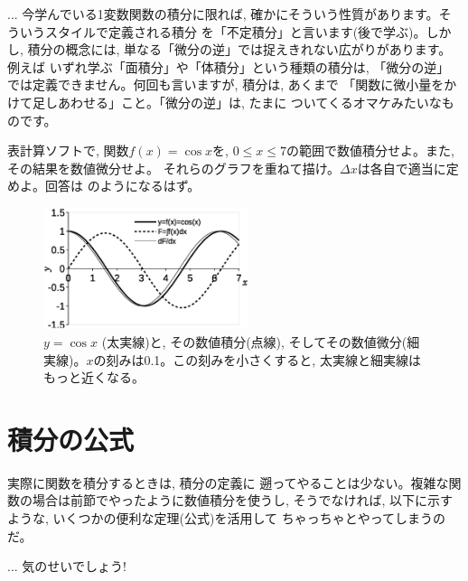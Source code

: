 \begin{freqmiss}{\small{} ... 今学んでいる1変数関数の積分に限れば, 
確かにそういう性質があります。そういうスタイルで定義される積分
を「不定積分」と言います(後で学ぶ)。しかし, 積分の概念には, 
単なる「微分の逆」では捉えきれない広がりがあります。例えば
いずれ学ぶ「面積分」や「体積分」という種類の積分は, 「微分の逆」
では定義できません。何回も言いますが, 積分は, あくまで
「関数に微小量をかけて足しあわせる」こと。「微分の逆」は, たまに
ついてくるオマケみたいなものです。}\end{freqmiss}

\begin{q}\label{q:comp_int2} 表計算ソフトで, 関数$f(x)=\cos x$を, 
$0 \le x \le 7$の範囲で数値積分せよ。また, その結果を数値微分せよ。
それらのグラフを重ねて描け。$\Delta x$は各自で適当に定めよ。回答は
のようになるはず。
\end{q}\mv

\begin{figure}[h]
    \centering
    \includegraphics[width=6cm]{intcos.eps}
    \caption{$y=\cos x$ (太実線)と, その数値積分(点線), 
そしてその数値微分(細実線)。$x$の刻みは0.1。この刻みを小さくすると, 
太実線と細実線はもっと近くなる。}\label{fig:intcos}
\end{figure}


\section{積分の公式}\label{sect:integral_formula}


実際に関数を積分するときは, 積分の定義に
遡ってやることは少ない。複雑な関数の場合は前節でやったように数値積分を使うし, 
そうでなければ, 以下に示すような, いくつかの便利な定理(公式)を活用して
ちゃっちゃとやってしまうのだ。

\begin{faq}{\small{} ... 気のせいでしょう!}\end{faq}

